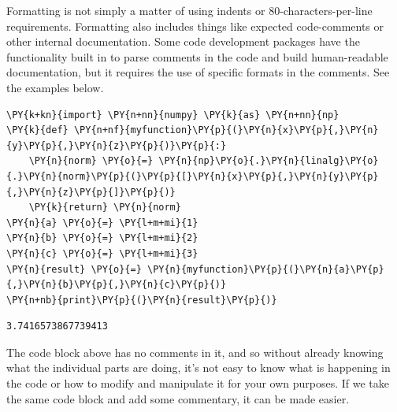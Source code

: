 Formatting is not simply a matter of using indents or
80-characters-per-line requirements. Formatting also includes things
like expected code-comments or other internal documentation. Some code
development packages have the functionality built in to parse comments
in the code and build human-readable documentation, but it requires the
use of specific formats in the comments. See the examples below.

    \begin{tcolorbox}[breakable, size=fbox, boxrule=1pt, pad at break*=1mm,colback=cellbackground, colframe=cellborder]
\begin{Verbatim}[commandchars=\\\{\}]
\PY{k+kn}{import} \PY{n+nn}{numpy} \PY{k}{as} \PY{n+nn}{np}
\PY{k}{def} \PY{n+nf}{myfunction}\PY{p}{(}\PY{n}{x}\PY{p}{,}\PY{n}{y}\PY{p}{,}\PY{n}{z}\PY{p}{)}\PY{p}{:}
    \PY{n}{norm} \PY{o}{=} \PY{n}{np}\PY{o}{.}\PY{n}{linalg}\PY{o}{.}\PY{n}{norm}\PY{p}{(}\PY{p}{[}\PY{n}{x}\PY{p}{,}\PY{n}{y}\PY{p}{,}\PY{n}{z}\PY{p}{]}\PY{p}{)}
    \PY{k}{return} \PY{n}{norm}
\PY{n}{a} \PY{o}{=} \PY{l+m+mi}{1}
\PY{n}{b} \PY{o}{=} \PY{l+m+mi}{2}
\PY{n}{c} \PY{o}{=} \PY{l+m+mi}{3}
\PY{n}{result} \PY{o}{=} \PY{n}{myfunction}\PY{p}{(}\PY{n}{a}\PY{p}{,}\PY{n}{b}\PY{p}{,}\PY{n}{c}\PY{p}{)}
\PY{n+nb}{print}\PY{p}{(}\PY{n}{result}\PY{p}{)}
\end{Verbatim}
\end{tcolorbox}

    \begin{Verbatim}[commandchars=\\\{\}]
3.7416573867739413
    \end{Verbatim}

    The code block above has no comments in it, and so without already
knowing what the individual parts are doing, it's not easy to know what
is happening in the code or how to modify and manipulate it for your own
purposes. If we take the same code block and add some commentary, it can
be made easier.

